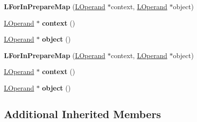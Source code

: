 \begin{DoxyCompactItemize}
\item 
{\bfseries L\+For\+In\+Prepare\+Map} (\hyperlink{classv8_1_1internal_1_1_l_operand}{L\+Operand} $\ast$context, \hyperlink{classv8_1_1internal_1_1_l_operand}{L\+Operand} $\ast$object)\hypertarget{classv8_1_1internal_1_1_l_for_in_prepare_map_a385cae813e246c3beeb67db5bbc83379}{}\label{classv8_1_1internal_1_1_l_for_in_prepare_map_a385cae813e246c3beeb67db5bbc83379}

\item 
\hyperlink{classv8_1_1internal_1_1_l_operand}{L\+Operand} $\ast$ {\bfseries context} ()\hypertarget{classv8_1_1internal_1_1_l_for_in_prepare_map_a2e3211c97e0ee0b7c5b1dc6c352c7768}{}\label{classv8_1_1internal_1_1_l_for_in_prepare_map_a2e3211c97e0ee0b7c5b1dc6c352c7768}

\item 
\hyperlink{classv8_1_1internal_1_1_l_operand}{L\+Operand} $\ast$ {\bfseries object} ()\hypertarget{classv8_1_1internal_1_1_l_for_in_prepare_map_aec0b2c5f56f128c747e1c8e7f2bd6b4d}{}\label{classv8_1_1internal_1_1_l_for_in_prepare_map_aec0b2c5f56f128c747e1c8e7f2bd6b4d}

\item 
{\bfseries L\+For\+In\+Prepare\+Map} (\hyperlink{classv8_1_1internal_1_1_l_operand}{L\+Operand} $\ast$context, \hyperlink{classv8_1_1internal_1_1_l_operand}{L\+Operand} $\ast$object)\hypertarget{classv8_1_1internal_1_1_l_for_in_prepare_map_a385cae813e246c3beeb67db5bbc83379}{}\label{classv8_1_1internal_1_1_l_for_in_prepare_map_a385cae813e246c3beeb67db5bbc83379}

\item 
\hyperlink{classv8_1_1internal_1_1_l_operand}{L\+Operand} $\ast$ {\bfseries context} ()\hypertarget{classv8_1_1internal_1_1_l_for_in_prepare_map_a2e3211c97e0ee0b7c5b1dc6c352c7768}{}\label{classv8_1_1internal_1_1_l_for_in_prepare_map_a2e3211c97e0ee0b7c5b1dc6c352c7768}

\item 
\hyperlink{classv8_1_1internal_1_1_l_operand}{L\+Operand} $\ast$ {\bfseries object} ()\hypertarget{classv8_1_1internal_1_1_l_for_in_prepare_map_aec0b2c5f56f128c747e1c8e7f2bd6b4d}{}\label{classv8_1_1internal_1_1_l_for_in_prepare_map_aec0b2c5f56f128c747e1c8e7f2bd6b4d}

\end{DoxyCompactItemize}
\subsection*{Additional Inherited Members}


